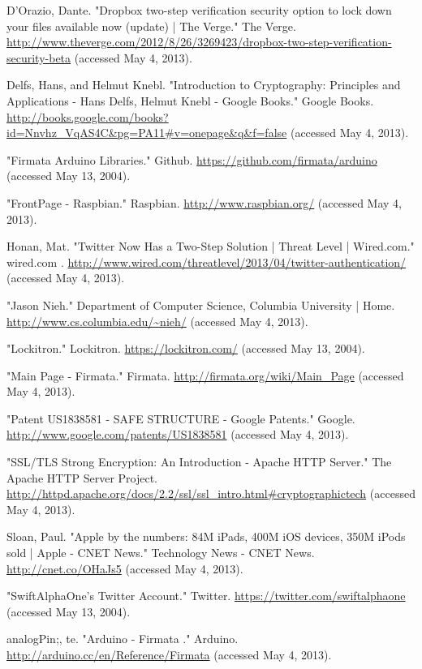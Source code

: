 \documentclass[10pt]{article}
\begin{document}
\begin{multicols}{2}
\begin{thebibliography}{99}
D'Orazio, Dante. "Dropbox two-step verification security option to lock down your files available now (update) | The Verge." The Verge. \url{http://www.theverge.com/2012/8/26/3269423/dropbox-two-step-verification-security-beta} (accessed May 4, 2013).

Delfs, Hans, and Helmut Knebl. "Introduction to Cryptography: Principles and Applications - Hans Delfs, Helmut Knebl - Google Books." Google Books. \url{http://books.google.com/books?id=Nnvhz_VqAS4C&pg=PA11#v=onepage&q&f=false} (accessed May 4, 2013).


"Firmata Arduino Libraries." Github. \url{https://github.com/firmata/arduino} (accessed May 13, 2004).

"FrontPage - Raspbian." Raspbian. \url{http://www.raspbian.org/} (accessed May 4, 2013).

Honan, Mat. "Twitter Now Has a Two-Step Solution | Threat Level | Wired.com." wired.com . \url{http://www.wired.com/threatlevel/2013/04/twitter-authentication/} (accessed May 4, 2013).

"Jason Nieh." Department of Computer Science, Columbia University | Home. \url{http://www.cs.columbia.edu/~nieh/} (accessed May 4, 2013).

"Lockitron." Lockitron. \url{https://lockitron.com/} (accessed May 13, 2004).

"Main Page - Firmata." Firmata. \url{http://firmata.org/wiki/Main_Page} (accessed May 4, 2013).

"Patent US1838581 - SAFE STRUCTURE - Google Patents." Google. \url{http://www.google.com/patents/US1838581} (accessed May 4, 2013).

"SSL/TLS Strong Encryption: An Introduction - Apache HTTP Server." The Apache HTTP Server Project. \url{http://httpd.apache.org/docs/2.2/ssl/ssl_intro.html#cryptographictech} (accessed May 4, 2013).

Sloan, Paul. "Apple by the numbers: 84M iPads, 400M iOS devices, 350M iPods sold | Apple - CNET News." Technology News - CNET News. \url{http://cnet.co/OHaJs5} (accessed May 4, 2013).

"SwiftAlphaOne's Twitter Account." Twitter. \url{https://twitter.com/swiftalphaone} (accessed May 13, 2004).

analogPin;, te. "Arduino - Firmata ." Arduino. \url{http://arduino.cc/en/Reference/Firmata} (accessed May 4, 2013).


\end{thebibliography}
\end{multicols}
\end{document}
